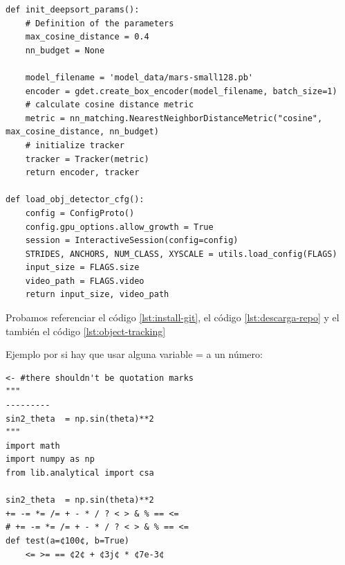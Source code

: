 \vspace{0.5cm}
\begin{lstlisting}[language=iPython,caption=Funciones de object tracking ,captionpos=b,label={lst:object-tracking}]
def init_deepsort_params():
    # Definition of the parameters
    max_cosine_distance = 0.4
    nn_budget = None

    model_filename = 'model_data/mars-small128.pb'
    encoder = gdet.create_box_encoder(model_filename, batch_size=1)
    # calculate cosine distance metric
    metric = nn_matching.NearestNeighborDistanceMetric("cosine", max_cosine_distance, nn_budget)
    # initialize tracker
    tracker = Tracker(metric)
    return encoder, tracker
    
def load_obj_detector_cfg():
    config = ConfigProto()
    config.gpu_options.allow_growth = True
    session = InteractiveSession(config=config)
    STRIDES, ANCHORS, NUM_CLASS, XYSCALE = utils.load_config(FLAGS)
    input_size = FLAGS.size
    video_path = FLAGS.video
    return input_size, video_path

\end{lstlisting}

Probamos referenciar el código \ref{lst:install-git}, el código \ref{lst:descarga-repo} y el también el código \ref{lst:object-tracking}

Ejemplo por si hay que usar alguna variable = a un número:

\begin{lstlisting}[language=iPython]
<- #there shouldn't be quotation marks
"""
---------
sin2_theta  = np.sin(theta)**2
"""
import math
import numpy as np
from lib.analytical import csa

sin2_theta  = np.sin(theta)**2
+= -= *= /= + - * / ? < > & % == <=
# += -= *= /= + - * / ? < > & % == <=
def test(a=¢100¢, b=True)
    <= >= == ¢2¢ + ¢3j¢ * ¢7e-3¢
\end{lstlisting}
